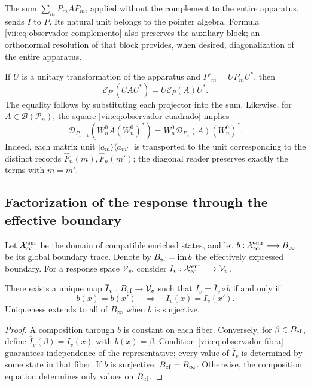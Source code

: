 The sum \(\sum_mP_mAP_m\), applied without the complement to the entire
apparatus, sends \(I\) to \(P\). Its natural unit belongs to the
pointer algebra. Formula \eqref{vii:eq:observador-complemento} also preserves
the auxiliary block; an orthonormal resolution of that block
provides, when desired, diagonalization of the entire apparatus.

If \(U\) is a unitary transformation of the apparatus and
\(P'_m=UP_mU^*\), then
\[
 \mathcal E_{P'}(UAU^*)=U\mathcal E_P(A)U^*.
\]
The equality follows by substituting each projector into the sum.
Likewise, for \(A\in\mathcal B(\mathcal P_n)\), the square
\eqref{vii:eq:observador-cuadrado} implies
\[
 \mathcal D_{P_{n+1}}(W_n^0A(W_n^0)^*)
 =W_n^0\mathcal D_{P_n}(A)(W_n^0)^*.
\]
Indeed, each matrix unit \(|a_m\rangle\langle a_{m'}|\)
is transported to the unit corresponding to the distinct records
\(\widehat F_n(m),\widehat F_n(m')\); the diagonal reader preserves
exactly the terms with \(m=m'\).

\subsection{Factorization of the response through the effective boundary}
\label{vii:sec:observador-factorizacion}

Let \(\mathcal X_\infty^{\rm enr}\) be the domain of compatible enriched
states, and let
\(b:\mathcal X_\infty^{\rm enr}\longrightarrow B_\infty\) be its global
boundary trace. Denote by \(B_{\rm ef}=\operatorname{im}b\)
the effectively expressed boundary. For a response space
\(\mathcal V_v\), consider
\(I_v:\mathcal X_\infty^{\rm enr}\longrightarrow\mathcal V_v\).

\begin{theorem}
\label{vii:thm:observador-factorizacion}
There exists a unique map \(\overline I_v:B_{\rm ef}\to\mathcal V_v\)
such that \(I_v=\overline I_v\circ b\) if and only if
\begin{equation}
 b(x)=b(x')\quad\Longrightarrow\quad I_v(x)=I_v(x').
 \label{vii:eq:observador-fibra}
\end{equation}
Uniqueness extends to all of \(B_\infty\) when \(b\) is
surjective.
\end{theorem}

\begin{proof}
A composition through \(b\) is constant on each fiber. Conversely,
for \(\beta\in B_{\rm ef}\), define
\(\overline I_v(\beta)=I_v(x)\) with \(b(x)=\beta\).
Condition \eqref{vii:eq:observador-fibra} guarantees independence
of the representative; every value of \(\overline I_v\) is determined
by some state in that fiber. If \(b\) is surjective,
\(B_{\rm ef}=B_\infty\). Otherwise, the composition equation
determines only values on \(B_{\rm ef}\).
\end{proof}

